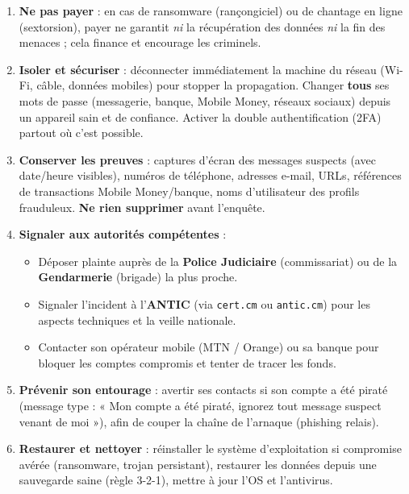 \documentclass[11pt]{article}
\begin{document}
\begin{methode}
\begin{enumerate}
\item \textbf{Ne pas payer} : en cas de ransomware (rançongiciel) ou de chantage en ligne (sextorsion), payer ne garantit \emph{ni} la récupération des données \emph{ni} la fin des menaces ; cela finance et encourage les criminels.
\item \textbf{Isoler et sécuriser} : déconnecter immédiatement la machine du réseau (Wi-Fi, câble, données mobiles) pour stopper la propagation. Changer \textbf{tous} ses mots de passe (messagerie, banque, Mobile Money, réseaux sociaux) depuis un appareil sain et de confiance. Activer la double authentification (2FA) partout où c'est possible.
\item \textbf{Conserver les preuves} : captures d'écran des messages suspects (avec date/heure visibles), numéros de téléphone, adresses e-mail, URLs, références de transactions Mobile Money/banque, noms d'utilisateur des profils frauduleux. \textbf{Ne rien supprimer} avant l'enquête.
\item \textbf{Signaler aux autorités compétentes} :
      \begin{itemize}
      \item Déposer plainte auprès de la \textbf{Police Judiciaire} (commissariat) ou de la \textbf{Gendarmerie} (brigade) la plus proche.
      \item Signaler l'incident à l'\textbf{ANTIC} (via \texttt{cert.cm} ou \texttt{antic.cm}) pour les aspects techniques et la veille nationale.
      \item Contacter son opérateur mobile (MTN / Orange) ou sa banque pour bloquer les comptes compromis et tenter de tracer les fonds.
      \end{itemize}
\item \textbf{Prévenir son entourage} : avertir ses contacts si son compte a été piraté (message type : « Mon compte a été piraté, ignorez tout message suspect venant de moi »), afin de couper la chaîne de l'arnaque (phishing relais).
\item \textbf{Restaurer et nettoyer} : réinstaller le système d'exploitation si compromise avérée (ransomware, trojan persistant), restaurer les données depuis une sauvegarde saine (règle 3-2-1), mettre à jour l'OS et l'antivirus.
\end{enumerate}
\end{methode}
\end{document}

